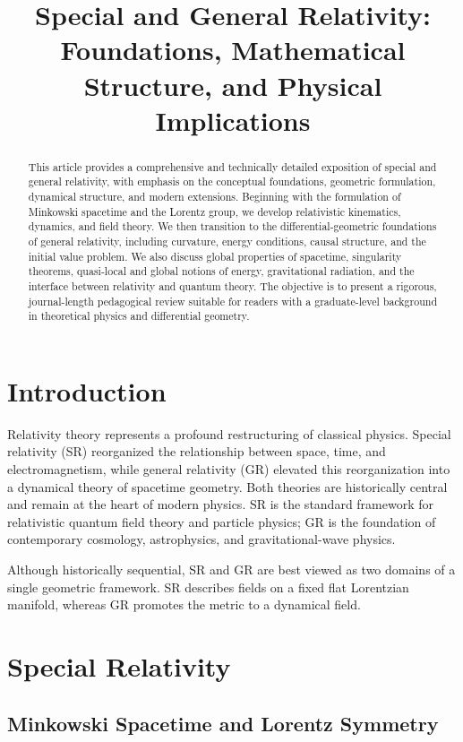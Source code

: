 \documentclass[12pt]{article}
\title{\textbf{Special and General Relativity: Foundations, Mathematical Structure, and Physical Implications}}
\author{}
\date{}
\begin{document}
\maketitle

\begin{abstract}
This article provides a comprehensive and technically detailed exposition of 
special and general relativity, with emphasis on the conceptual foundations, 
geometric formulation, dynamical structure, and modern extensions.
Beginning with the formulation of Minkowski spacetime and the Lorentz group, 
we develop relativistic kinematics, dynamics, and field theory. 
We then transition to the differential-geometric foundations of general 
relativity, including curvature, energy conditions, causal structure, and the 
initial value problem. We also discuss global properties of spacetime, 
singularity theorems, quasi-local and global notions of energy, gravitational 
radiation, and the interface between relativity and quantum theory. 
The objective is to present a rigorous, journal-length pedagogical review 
suitable for readers with a graduate-level background in theoretical physics 
and differential geometry.
\end{abstract}

\section{Introduction}

Relativity theory represents a profound restructuring of classical physics.
Special relativity (SR) reorganized the relationship between space, time, and 
electromagnetism, while general relativity (GR) elevated this reorganization 
into a dynamical theory of spacetime geometry. Both theories are historically
central and remain at the heart of modern physics. SR is the standard 
framework for relativistic quantum field theory and particle physics; 
GR is the foundation of contemporary cosmology, astrophysics, and 
gravitational-wave physics.

Although historically sequential, SR and GR are best viewed as two domains 
of a single geometric framework. SR describes fields on a fixed flat 
Lorentzian manifold, whereas GR promotes the metric to a dynamical field.

\section{Special Relativity}

\subsection{Minkowski Spacetime and Lorentz Symmetry}
\end{document}
